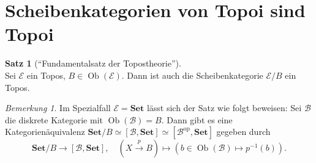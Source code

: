 \documentclass{article}
\theoremstyle{definition}
\newtheorem*{satz}{Satz}
\theoremstyle{remark}
\newtheorem*{bem}{Bemerkung}
\newcommand{\?}{\,{:}\,}
\renewcommand{\_}{\mathpunct{.}\,}
\DeclareMathOperator{\Ob}{Ob} %
\newcommand{\op}{\mathrm{op}} %
\newcommand{\SetC}{\mathbf{Set}} %
\newcommand{\FuncC}[2]{[{#1}, {#2}]} %
\newcommand{\Bat}{\mathcal{B}} %
\newcommand{\Eat}{\mathcal{E}} %
\begin{document}
\section{Scheibenkategorien von Topoi sind Topoi}

\begin{satz}["`Fundamentalsatz der Topostheorie"'] \mbox{}\\
  Sei $\Eat$ ein Topos, $B \in \Ob(\Eat)$.
  Dann ist auch die Scheibenkategorie $\Eat / B$ ein Topos.
\end{satz}

\begin{bem}
  Im Spezialfall $\Eat = \SetC$ lässt sich der Satz wie folgt beweisen:
  Sei $\Bat$ die diskrete Kategorie mit $\Ob(\Bat) = B$.
  Dann gibt es eine Kategorienäquivalenz $\SetC/B \simeq \FuncC{\Bat}{\SetC} \simeq \FuncC{\Bat^\op}{\SetC}$ gegeben durch
  \[
    \SetC/B \to \FuncC{\Bat}{\SetC}, \quad  
    (X \xrightarrow{p} B) \mapsto (b \in \Ob(\Bat) \mapsto p^{-1}(b)).
  \]
\end{bem}
\end{document}
